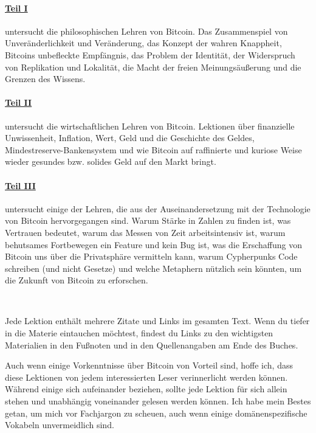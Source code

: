 \paragraph{\hyperref[ch:philosophy]{Teil I}} untersucht die philosophischen
Lehren von Bitcoin. Das Zusammenspiel von Unveränderlichkeit und Veränderung,
das Konzept der wahren Knappheit, Bitcoins unbefleckte Empfängnis, das Problem
der Identität, der Widerspruch von Replikation und Lokalität, die Macht der freien
Meinungsäußerung und die Grenzen des Wissens.

\paragraph{\hyperref[ch:economics]{Teil II}} untersucht die wirtschaftlichen
Lehren von Bitcoin. Lektionen über finanzielle Unwissenheit, Inflation, Wert,
Geld und die Geschichte des Geldes, Mindestreserve-Bankensystem und wie Bitcoin
auf raffinierte und kuriose Weise wieder gesundes bzw. solides Geld auf den
Markt bringt.

\paragraph{\hyperref[ch:technology]{Teil III}} untersucht einige der Lehren, die
aus der Auseinandersetzung mit der Technologie von Bitcoin hervorgegangen sind.
Warum Stärke in Zahlen zu finden ist, was Vertrauen bedeutet, warum das
Messen von Zeit arbeitsintensiv ist, warum behutsames Fortbewegen ein Feature
und kein Bug ist, was die Erschaffung von Bitcoin uns über die Privatsphäre
vermitteln kann, warum Cypherpunks Code schreiben (und nicht Gesetze) und welche
Metaphern nützlich sein könnten, um die Zukunft von Bitcoin zu erforschen.

~

Jede Lektion enthält mehrere Zitate und Links im gesamten Text. Wenn du tiefer
in die Materie eintauchen möchtest, findest du Links zu den wichtigsten
Materialien in den Fußnoten und in den Quellenangaben am Ende des Buches.

Auch wenn einige Vorkenntnisse über Bitcoin von Vorteil sind, hoffe ich, dass
diese Lektionen von jedem interessierten Leser verinnerlicht werden können.
Während einige sich aufeinander beziehen, sollte jede Lektion für sich allein
stehen und unabhängig voneinander gelesen werden können. Ich habe mein Bestes
getan, um mich vor Fachjargon zu scheuen, auch wenn einige domänenspezifische
Vokabeln unvermeidlich sind.

